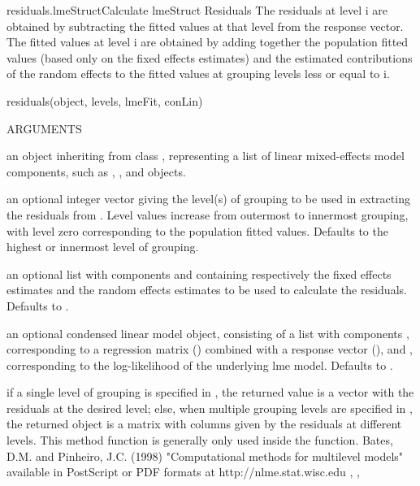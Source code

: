 \documentclass[pdftex]{article} \usepackage{url,graphicx}
\begin{document}
\begin{Helpfile}{residuals.lmeStruct}{Calculate lmeStruct Residuals}
The residuals at level i are obtained by subtracting the fitted
values at that level from the response vector. The fitted values at
level i are obtained by adding together the population fitted
values (based only on the fixed effects estimates) and the estimated
contributions of the random effects to the fitted values at grouping
levels less or equal to i.
\begin{Example}
residuals(object, levels, lmeFit, conLin)
\end{Example}
\begin{Argument}{ARGUMENTS}
\item[\Co{object:}]
an object inheriting from class ,
representing a list of linear mixed-effects model components, such as
, , and  objects.
\item[\Co{level:}]
an optional integer vector giving the level(s) of grouping
to be used in extracting the residuals from . Level
values increase from outermost to innermost grouping, with
level zero corresponding to the population fitted values. Defaults to
the highest or innermost level of grouping.
\item[\Co{lmeFit:}]
an optional list with components  and 
containing respectively the fixed effects estimates and the random
effects estimates to be used to calculate the residuals. Defaults
to .
\item[\Co{conLin:}]
an optional condensed linear model object, consisting of
a list with components , corresponding to a regression
matrix () combined with a response vector (), and 
, corresponding to the log-likelihood of the
underlying lme model. Defaults to .
\end{Argument}
if a single level of grouping is specified in ,
the returned value is a vector with the residuals at the desired
level; else, when multiple grouping levels are specified in
, the returned object is a matrix with 
columns given by the residuals at different levels.
 This method function is generally only used inside the 
function.
Bates, D.M. and Pinheiro, J.C. (1998) "Computational methods for
multilevel models" available in PostScript or PDF formats at
http://nlme.stat.wisc.edu
, ,
\end{Helpfile}
\end{document}
